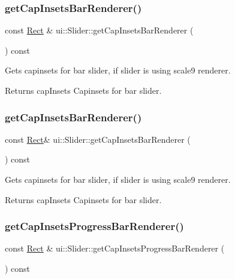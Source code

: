 \subsubsection{\texorpdfstring{get\+Cap\+Insets\+Bar\+Renderer()}{getCapInsetsBarRenderer()}\hspace{0.1cm}{\footnotesize\ttfamily [1/2]}}
{\footnotesize\ttfamily const \hyperlink{classRect}{Rect} \& ui\+::\+Slider\+::get\+Cap\+Insets\+Bar\+Renderer (\begin{DoxyParamCaption}{ }\end{DoxyParamCaption}) const}

Gets capinsets for bar slider, if slider is using scale9 renderer. \begin{DoxyReturn}{Returns}
cap\+Insets Capinsets for bar slider. 
\end{DoxyReturn}
\mbox{\label{classui_1_1Slider_a9b50003f59b9527d73eea296e7d23de8}} 
\subsubsection{\texorpdfstring{get\+Cap\+Insets\+Bar\+Renderer()}{getCapInsetsBarRenderer()}\hspace{0.1cm}{\footnotesize\ttfamily [2/2]}}
{\footnotesize\ttfamily const \hyperlink{classRect}{Rect}\& ui\+::\+Slider\+::get\+Cap\+Insets\+Bar\+Renderer (\begin{DoxyParamCaption}{ }\end{DoxyParamCaption}) const}

Gets capinsets for bar slider, if slider is using scale9 renderer. \begin{DoxyReturn}{Returns}
cap\+Insets Capinsets for bar slider. 
\end{DoxyReturn}
\mbox{\label{classui_1_1Slider_a8445d393893477f86193c57608fc668c}} 
\subsubsection{\texorpdfstring{get\+Cap\+Insets\+Progress\+Bar\+Renderer()}{getCapInsetsProgressBarRenderer()}\hspace{0.1cm}{\footnotesize\ttfamily [1/2]}}
{\footnotesize\ttfamily const \hyperlink{classRect}{Rect} \& ui\+::\+Slider\+::get\+Cap\+Insets\+Progress\+Bar\+Renderer (\begin{DoxyParamCaption}{ }\end{DoxyParamCaption}) const}

